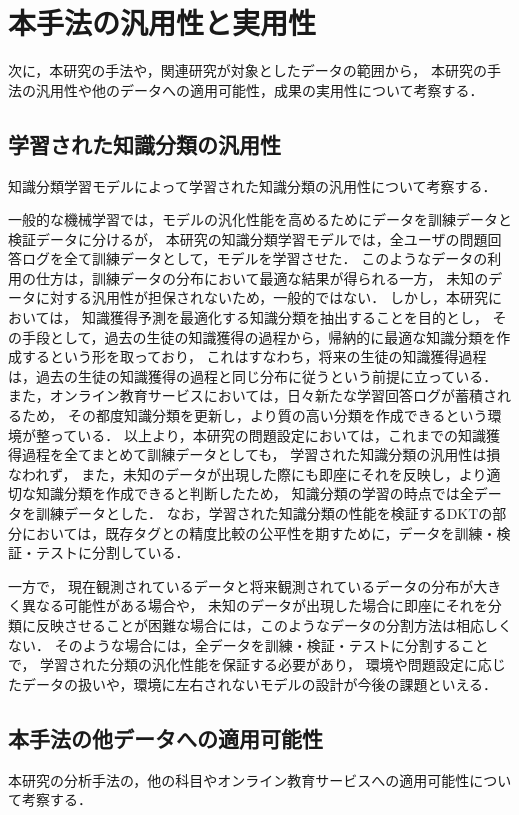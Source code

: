 \section{本手法の汎用性と実用性}
次に，本研究の手法や，関連研究が対象としたデータの範囲から，
本研究の手法の汎用性や他のデータへの適用可能性，成果の実用性について考察する．

\subsection{学習された知識分類の汎用性}
知識分類学習モデルによって学習された知識分類の汎用性について考察する．

一般的な機械学習では，モデルの汎化性能を高めるためにデータを訓練データと検証データに分けるが，
本研究の知識分類学習モデルでは，全ユーザの問題回答ログを全て訓練データとして，モデルを学習させた．
このようなデータの利用の仕方は，訓練データの分布において最適な結果が得られる一方，
未知のデータに対する汎用性が担保されないため，一般的ではない．
しかし，本研究においては，
知識獲得予測を最適化する知識分類を抽出することを目的とし，
その手段として，過去の生徒の知識獲得の過程から，帰納的に最適な知識分類を作成するという形を取っており，
これはすなわち，将来の生徒の知識獲得過程は，過去の生徒の知識獲得の過程と同じ分布に従うという前提に立っている．
また，オンライン教育サービスにおいては，日々新たな学習回答ログが蓄積されるため，
その都度知識分類を更新し，より質の高い分類を作成できるという環境が整っている．
以上より，本研究の問題設定においては，これまでの知識獲得過程を全てまとめて訓練データとしても，
学習された知識分類の汎用性は損なわれず，
また，未知のデータが出現した際にも即座にそれを反映し，より適切な知識分類を作成できると判断したため，
知識分類の学習の時点では全データを訓練データとした．
なお，学習された知識分類の性能を検証するDKTの部分においては，既存タグとの精度比較の公平性を期すために，データを訓練・検証・テストに分割している．

一方で，
現在観測されているデータと将来観測されているデータの分布が大きく異なる可能性がある場合や，
未知のデータが出現した場合に即座にそれを分類に反映させることが困難な場合には，このようなデータの分割方法は相応しくない．
そのような場合には，全データを訓練・検証・テストに分割することで，
学習された分類の汎化性能を保証する必要があり，
環境や問題設定に応じたデータの扱いや，環境に左右されないモデルの設計が今後の課題といえる．


\subsection{本手法の他データへの適用可能性}
本研究の分析手法の，他の科目やオンライン教育サービスへの適用可能性について考察する．

